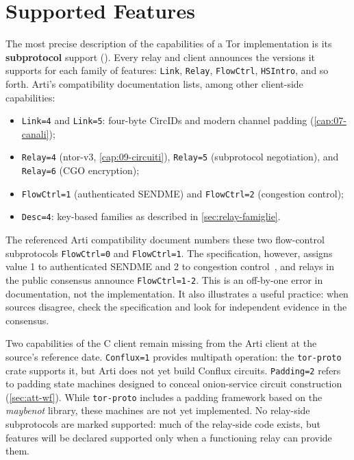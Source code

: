 \section{Supported Features}\label{sec:arti-supporto}

The most precise description of the capabilities of a Tor implementation is its \textbf{subprotocol} support (). Every relay and client announces the versions it supports for each family of features: \texttt{Link}, \texttt{Relay}, \texttt{FlowCtrl}, \texttt{HSIntro}, and so forth. Arti's compatibility documentation lists, among other client-side capabilities:
\begin{itemize}
  \item \texttt{Link=4} and \texttt{Link=5}: four-byte CircIDs and modern channel padding (\cref{cap:07-canali});
  \item \texttt{Relay=4} (ntor-v3, \cref{cap:09-circuiti}), \texttt{Relay=5} (subprotocol negotiation), and \texttt{Relay=6} (CGO encryption);
  \item \texttt{FlowCtrl=1} (authenticated SENDME) and \texttt{FlowCtrl=2} (congestion control);
  \item \texttt{Desc=4}: key-based families as described in \cref{sec:relay-famiglie}.
\end{itemize}

\begin{attenzione}
The referenced Arti compatibility document numbers these two flow-control subprotocols \texttt{FlowCtrl=0} and \texttt{FlowCtrl=1}. The specification, however, assigns value 1 to authenticated SENDME and 2 to congestion control~, and relays in the public consensus announce \texttt{FlowCtrl=1-2}. This is an off-by-one error in documentation, not the implementation. It also illustrates a useful practice: when sources disagree, check the specification and look for independent evidence in the consensus.
\end{attenzione}

Two capabilities of the C client remain missing from the Arti client at the source's reference date. \texttt{Conflux=1} provides multipath operation: the \texttt{tor-proto} crate supports it, but Arti does not yet build Conflux circuits. \texttt{Padding=2} refers to padding state machines designed to conceal onion-service circuit construction (\cref{sec:att-wf}). While \texttt{tor-proto} includes a padding framework based on the \emph{maybenot} library, these machines are not yet implemented. No relay-side subprotocols are marked supported: much of the relay-side code exists, but features will be declared supported only when a functioning relay can provide them.

